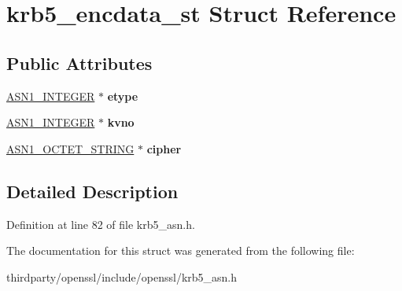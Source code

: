 \hypertarget{structkrb5__encdata__st}{}\section{krb5\+\_\+encdata\+\_\+st Struct Reference}
\label{structkrb5__encdata__st}
\subsection*{Public Attributes}
\begin{DoxyCompactItemize}
\item 
\mbox{\label{structkrb5__encdata__st_aa930746062320a82be3d81e363dd4ebf}} 
\hyperlink{structasn1__string__st}{A\+S\+N1\+\_\+\+I\+N\+T\+E\+G\+ER} $\ast$ {\bfseries etype}
\item 
\mbox{\label{structkrb5__encdata__st_a30352f26d2741ac03df07c308f0bbb66}} 
\hyperlink{structasn1__string__st}{A\+S\+N1\+\_\+\+I\+N\+T\+E\+G\+ER} $\ast$ {\bfseries kvno}
\item 
\mbox{\label{structkrb5__encdata__st_a55de40ea971f2f93c618ea49322cbe0c}} 
\hyperlink{structasn1__string__st}{A\+S\+N1\+\_\+\+O\+C\+T\+E\+T\+\_\+\+S\+T\+R\+I\+NG} $\ast$ {\bfseries cipher}
\end{DoxyCompactItemize}


\subsection{Detailed Description}


Definition at line 82 of file krb5\+\_\+asn.\+h.



The documentation for this struct was generated from the following file\+:\begin{DoxyCompactItemize}
\item 
thirdparty/openssl/include/openssl/krb5\+\_\+asn.\+h\end{DoxyCompactItemize}

